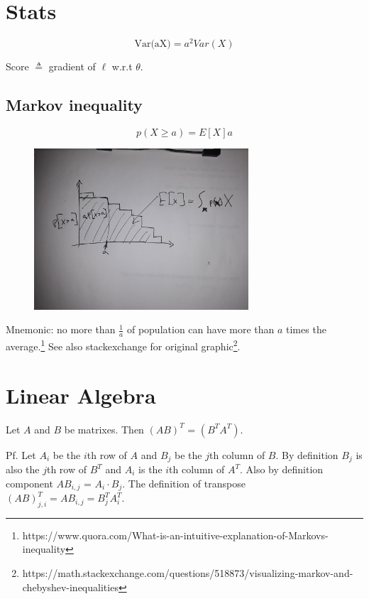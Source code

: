 \documentclass[12pt]{amsart}
\title{}
\author{}
\date{} %
\begin{document}
\maketitle
\tableofcontents

\section{Stats}

$$
\text{Var(aX)} = a^2 Var(X)
$$

Score $\triangleq$ gradient of $\ell$ w.r.t  $\theta$.

\subsection{Markov inequality}

$$p(X\geq a) = E[X] a$$

\begin{figure}[h]
\centering
\includegraphics[width=8cm]{markov.jpg}
\end{figure}

Mnemonic: no more than $\frac{1}{a}$ of population can have more than $a$ times the average.\footnote{https://www.quora.com/What-is-an-intuitive-explanation-of-Markovs-inequality} See also stackexchange for original graphic\footnote{https://math.stackexchange.com/questions/518873/visualizing-markov-and-chebyshev-inequalities}.

\section{Linear Algebra}

Let $A$ and $B$ be matrixes. Then $(AB)^T$ = $(B^T A^T)$. 

Pf. Let $A_i$ be the $i$th row of $A$ and $B_j$ be the $j$th column of $B$.  By definition $B_j$ is also the $j$th row of $B^T$ and $A_i$ is the $i$th column of $A^T$. Also by definition component $AB_{i,j}$ = $A_i \cdot B_j$. The definition of transpose $(AB)^T_{j,i} = AB_{i,j} = B^T_{j}A^T_i$.
\end{document}

